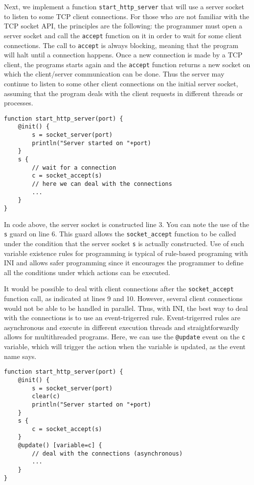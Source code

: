 \documentclass[11pt]{article}
\begin{document}
Next, we implement a function \texttt{start\_http\_server} that will use a server socket to listen to some TCP client connections. For those who are not familiar with the TCP socket API, the principles are the following: the programmer must open a server socket and call the \texttt{accept} function on it in order to wait for some client connections. The call to \texttt{accept} is always blocking, meaning that the program will halt until a connection happens. Once a new connection is made by a TCP client, the programs starts again and the \texttt{accept} function returns a  new socket on which the client/server communication can be done. Thus the server may continue to listen to some other client connections on the initial server socket, assuming that the program deals with the client requests in different threads or processes.

\begin{lstlisting}
function start_http_server(port) {
	@init() {
		s = socket_server(port)
		println("Server started on "+port)
	}
	s {
		// wait for a connection
		c = socket_accept(s)
		// here we can deal with the connections
		...
	}
}
\end{lstlisting}

In code above, the server socket is constructed line 3. You can note the use of the \texttt{s} guard on line 6. This guard allows the \texttt{socket\_accept} function to be called under the condition that the server socket \texttt{s} is actually constructed. Use of such variable existence rules for programming is typical of rule-based programing with INI and allows safer programming since it encourages the programmer to define all the conditions under which actions can be executed.

It would be possible to deal with client connections after the \texttt{socket\_accept} function call, as indicated at lines 9 and 10. However, several client connections would not be able to be handled in parallel. Thus, with INI, the best way to deal with the connections is to use an event-trigerred rule. Event-trigerred rules are asynchronous and execute in different execution threads and straightforwardly allows for multithreaded programs. Here, we can use the \texttt{@update} event on the \texttt{c} variable, which will trigger the action when the variable is updated, as the event name says.

\begin{lstlisting}
function start_http_server(port) {
	@init() {
		s = socket_server(port)
		clear(c)
		println("Server started on "+port)
	}
	s {
		c = socket_accept(s)
	}
	@update() [variable=c] {
		// deal with the connections (asynchronous)
		...
	}
}
\end{lstlisting}
\end{document}
